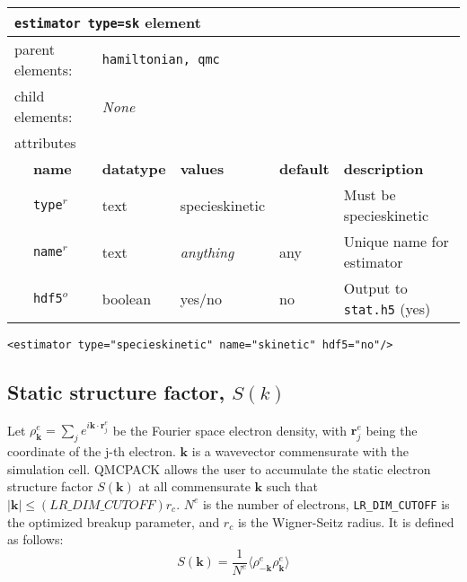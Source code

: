 \FloatBarrier
\begin{table}[h]
\begin{center}
\begin{tabularx}{\textwidth}{l l l l l l }
\hline
\multicolumn{6}{l}{\texttt{estimator type=sk} element} \\
\hline
\multicolumn{2}{l}{parent elements:} & \multicolumn{4}{l}{\texttt{hamiltonian, qmc}}\\
\multicolumn{2}{l}{child  elements:} & \multicolumn{4}{l}{\textit{None}}\\
\multicolumn{2}{l}{attributes}  & \multicolumn{4}{l}{}\\
   & \bfseries name       & \bfseries datatype & \bfseries values  & \bfseries default   & \bfseries description \\
   & \texttt{type}$^r$    &  text              & specieskinetic      &                     & Must be specieskinetic       \\
   & \texttt{name}$^r$    &  text              & \textit{anything} & any                 & Unique name for estimator \\
   & \texttt{hdf5}$^o$    &  boolean           & yes/no            & no                  & Output to \texttt{stat.h5} (yes) \\
  \hline
\end{tabularx}
\end{center}
\end{table}
\FloatBarrier


\begin{lstlisting}[caption=Species kinetic energy estimator element.]
  <estimator type="specieskinetic" name="skinetic" hdf5="no"/>
\end{lstlisting}

\subsection{Static structure factor, $S(k)$}

Let $\rho^e_{\mathbf{k}}=\sum_j e^{i \mathbf{k}\cdot\mathbf{r}_j^e}$ be the Fourier space electron density, with $\mathbf{r}^e_j$ being the coordinate of the j-th electron.  $\mathbf{k}$ is a wavevector commensurate with the simulation cell.  QMCPACK allows the user to accumulate the static electron structure factor $S(\mathbf{k})$ at all commensurate $\mathbf{k}$ such that $|\mathbf{k}| \leq (LR\_DIM\_CUTOFF) r_c$.  $N^e$ is the number of electrons, \texttt{LR\_DIM\_CUTOFF} is the optimized breakup parameter, and $r_c$ is the Wigner-Seitz radius.  It is defined as follows:
\begin{equation}
S(\mathbf{k}) = \frac{1}{N^e}\langle \rho^e_{-\mathbf{k}} \rho^e_{\mathbf{k}} \rangle
\end{equation}


